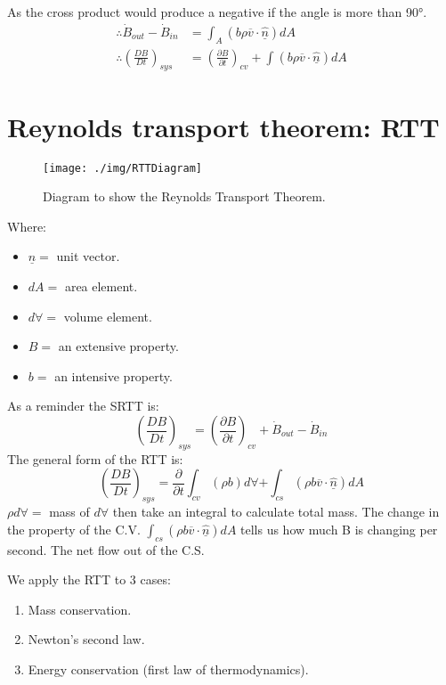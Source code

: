 As the cross product would produce a negative if the angle is more than \ang{90}.
\begin{align}
  \therefore \dot{B}_{out} - \dot{B}_{in}       & = \int_A (b \rho \overline{v}\cdot \underline{\hat{n}})dA                                                    \\
  \therefore \left( \frac{DB}{Dt} \right)_{sys} & = \left( \frac{\partial B}{\partial t} \right)_{cv} + \int (b \rho \overline{v}\cdot \underline{\hat{n}}) dA
\end{align}
\section{Reynolds transport theorem: RTT}
\begin{figure}
  \centering
  \texttt{[image: ./img/RTTDiagram]}
  \caption{Diagram to show the Reynolds Transport Theorem.}
\end{figure}
Where:
\begin{itemize}[noitemsep]
  \item $\underline{\hat{n}} =$ unit vector.
  \item $dA =$ area element.
  \item $d\forall =$ volume element.
  \item $B =$ an extensive property.
  \item $b =$ an intensive property.
\end{itemize}
As a reminder the SRTT is:
\begin{equation}
  \left( \frac{DB}{Dt} \right)_{sys} = \left( \frac{\partial B}{\partial t} \right)_{cv} + \dot{B}_{out} - \dot{B}_{in}
\end{equation}
The general form of the RTT is:
\begin{equation}
  \left( \frac{DB}{Dt} \right)_{sys} = \frac{\partial}{\partial t} \int_{cv} (\rho b) d\forall + \int_{cs} (\rho b \overline{v} \cdot \underline{\hat{n}}) dA
\end{equation}
$\rho d \forall =$ mass of $d\forall$ then take an integral to calculate total mass. The change in the property of the C.V. $\int_{cs} (\rho b \overline{v} \cdot \underline{\hat{n}}) dA$ tells us how much B is changing per second. The net flow out of the C.S.

We apply the RTT to 3 cases:
\begin{enumerate}[noitemsep]
  \item Mass conservation.
  \item Newton's second law.
  \item Energy conservation (first law of thermodynamics).
\end{enumerate}
